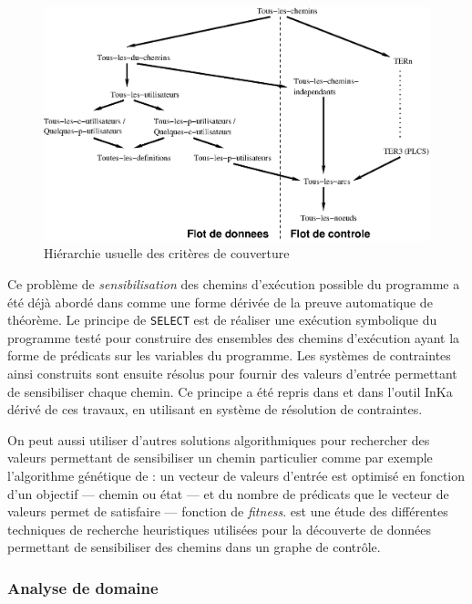 \begin{figure}[htbp]
    \centering
    \includegraphics[width=\textwidth] {figures/hiertest.eps}
    \caption{Hi\'erarchie usuelle des crit\`eres de couverture}
    \label{fig-hierarchie-couv}
\end{figure}

Ce  probl\`eme  de \emph{sensibilisation} des chemins d'ex\'ecution
possible du programme a \'et\'e d\'ej\`a abord\'e dans
\cite{boyer-select} comme une forme d\'eriv\'ee de la preuve
automatique de th\'eor\`eme. Le principe de \texttt{SELECT} est de
r\'ealiser une ex\'ecution symbolique du programme test\'e pour
construire des ensembles des chemins d'ex\'ecution ayant la forme de
pr\'edicats sur les variables du programme. Les syst\`emes de
contraintes ainsi construits sont ensuite r\'esolus pour fournir des
valeurs d'entr\'ee permettant de sensibiliser chaque chemin. Ce
principe a \'et\'e repris dans \cite{gotlieb-clp-test} et dans
l'outil \textsf{InKa} d\'eriv\'e de ces travaux, en utilisant en syst\`eme
de r\'esolution de contraintes.

On peut aussi utiliser d'autres solutions algorithmiques pour
rechercher des valeurs permettant de sensibiliser un chemin
particulier comme par exemple l'algorithme g\'en\'etique de
\cite{testgenetic} : un vecteur de valeurs d'entr\'ee est
optimis\'e en fonction d'un objectif --- chemin ou \'etat --- et du
nombre de pr\'edicats que le vecteur de valeurs permet de satisfaire
--- fonction de \emph{fitness}.  \cite{tdgen-survey} est une \'etude
des diff\'erentes techniques de recherche heuristiques utilis\'ees
pour la d\'ecouverte de donn\'ees permettant de sensibiliser des
chemins dans un graphe de contr\^ole.

\subsubsection{Analyse de domaine}

